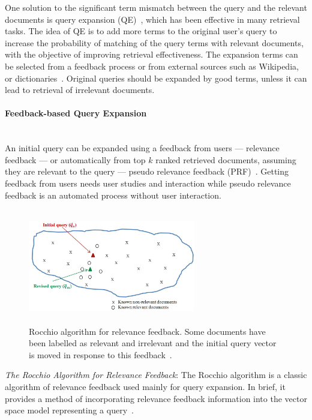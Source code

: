 One solution to the significant term mismatch between the query and the relevant documents is query expansion (QE)~\citep{Efthimiadis1996}, which has been effective in many retrieval tasks. The idea of QE is to add more terms to the original user's query to increase the probability of matching of the query terms with relevant documents, with the objective of improving retrieval effectiveness. The expansion terms can be selected from a feedback process or from external sources such as Wikipedia, or dictionaries~\citep{cao2008selecting}. Original queries should be expanded by good terms, unless it can lead to retrieval of irrelevant documents.
\paragraph{Feedback-based Query Expansion}
\ \\
An initial query can be expanded using a feedback from users --- relevance feedback --- or automatically from top $ k $ ranked retrieved documents, assuming they are relevant to the query --- pseudo relevance feedback (PRF)~\citep{manning2008introduction}. Getting feedback from  users needs user studies and interaction while pseudo relevance feedback is an automated process without user interaction.
\begin{figure}[t!]
   \centering
   \includegraphics[width=0.65\textwidth,height=50mm]{figs/rocchio.jpg}
   \caption{Rocchio algorithm for relevance feedback. Some documents have been labelled as relevant and irrelevant and the initial query vector is moved in response to this feedback~\citep{manning2008introduction}.}  
   \label{fig:rocchio} 
\end{figure}
\FloatBarrier 
\textit{The Rocchio Algorithm for Relevance Feedback}: The Rocchio
algorithm \citep{Salton1971} is a classic algorithm of relevance feedback
used mainly for query expansion. In brief, it provides a method of
incorporating relevance feedback information into the vector space
model representing a query~\citep{manning2008introduction}. 
